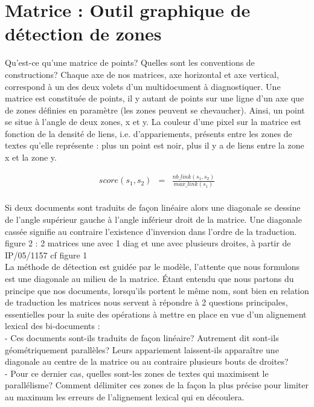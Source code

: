 \documentclass[10pt,a4paper,twoside]{article}
\begin{document}
\section{Matrice : Outil graphique de détection de zones}
Qu'est-ce qu'une matrice de points? Quelles sont les conventions de constructions?
Chaque axe de nos matrices, axe horizontal et axe vertical, correspond à un des deux volets d'un multidocument à diagnostiquer. Une matrice est constituée de points, il y autant de points sur une ligne d'un axe que de zones définies en paramètre (les zones peuvent se chevaucher). Ainsi, un point se situe à l'angle de deux zones, x et y. La couleur d'une pixel sur la matrice est fonction de la densité de liens, i.e. d'appariements, présents entre les zones de textes qu'elle représente : plus un point est noir, plus il y a de liens entre la zone x et la zone y.

\begin{eqnarray*}
  score(s_1, s_2) & = & 
  \frac{
    nb\_link(s_1, s_2)
  }{
    max\_link(s_1)
  } \\
\end{eqnarray*}

Si deux documents sont traduits de façon linéaire alors une diagonale se dessine de l'angle supérieur gauche à l'angle inférieur droit de la matrice. Une diagonale cassée signifie au contraire l'existence d'inversion dans l'ordre de la traduction.  \\

figure 2  : 2 matrices une avec 1 diag et une avec plusieurs droites, à partir de IP/05/1157 cf figure 1\\

La méthode de détection est guidée par le modèle, l'attente que nous formulons est une diagonale au milieu de la matrice. 
\'Etant entendu que nous partons du principe que nos documents, lorsqu'ils portent le même nom, sont bien en relation de traduction  les matrices nous servent à répondre à 2 questions principales, essentielles pour la suite des opérations à mettre en place en vue d'un alignement lexical des bi-documents :\\
- Ces documents sont-ils traduits de façon linéaire? Autrement dit sont-ils géométriquement parallèles? Leurs appariement laissent-ils apparaître une diagonale au centre de la matrice ou au contraire plusieurs bouts de droites?  \\
- Pour ce dernier cas, quelles sont-les zones de textes qui maximisent le parallélisme? Comment délimiter ces zones de la façon la plus précise pour limiter au maximum les erreurs de l'alignement lexical qui en découlera.\\
\end{document}
